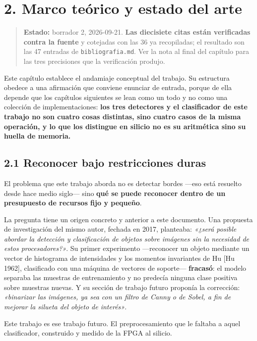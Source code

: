 \chapter{2. Marco teórico y estado del
arte}\label{marco-teuxf3rico-y-estado-del-arte}

\begin{quote}
\textbf{Estado:} borrador 2, 2026-09-21. \textbf{Las diecisiete citas
están verificadas contra la fuente} y cotejadas con las 36 ya
recopiladas; el resultado son las 47 entradas de
\texttt{bibliografia.md}. Ver la nota al final del capítulo para las
tres precisiones que la verificación produjo.
\end{quote}

Este capítulo establece el andamiaje conceptual del trabajo. Su
estructura obedece a una afirmación que conviene enunciar de entrada,
porque de ella depende que los capítulos siguientes se lean como un todo
y no como una colección de implementaciones: \textbf{los tres detectores
y el clasificador de este trabajo no son cuatro cosas distintas, sino
cuatro casos de la misma operación, y lo que los distingue en silicio no
es su aritmética sino su huella de memoria.}

\section{2.1 Reconocer bajo restricciones
duras}\label{reconocer-bajo-restricciones-duras}

El problema que este trabajo aborda no es detectar bordes ---eso está
resuelto desde hace medio siglo--- sino \textbf{qué se puede reconocer
dentro de un presupuesto de recursos fijo y pequeño}.

La pregunta tiene un origen concreto y anterior a este documento. Una
propuesta de investigación del mismo autor, fechada en 2017, planteaba:
\emph{«¿será posible abordar la detección y clasificación de objetos
sobre imágenes sin la necesidad de estos procesadores?»}. Su primer
experimento ---reconocer un objeto mediante un vector de histograma de
intensidades y los momentos invariantes de Hu {[}Hu 1962{]}, clasificado
con una máquina de vectores de soporte--- \textbf{fracasó}: el modelo
separaba las muestras de entrenamiento y no predecía ninguna clase
positiva sobre muestras nuevas. Y su sección de trabajo futuro proponía
la corrección: \emph{«binarizar las imágenes, ya sea con un filtro de
Canny o de Sobel, a fin de mejorar la silueta del objeto de interés»}.

Este trabajo es ese trabajo futuro. El preprocesamiento que le faltaba a
aquel clasificador, construido y medido de la FPGA al silicio.

